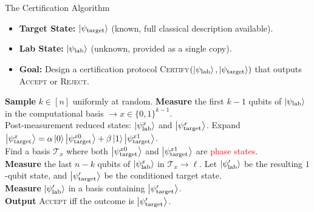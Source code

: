 \begin{frame}{The Certification Algorithm}
    \begin{itemize}
        \item \textbf{Target State:} $\ket{\psi_{\text{target}}}$ (known, full classical description available).
        \item \textbf{Lab State:} $\ket{\psi_{\text{lab}}}$ (unknown, provided as a single copy).
        \item \textbf{Goal:} Design a certification protocol \textsc{Certify}$(\ket{\psi_{\text{lab}}}, \ket{\psi_{\text{target}}})$ that outputs \textsc{Accept} or \textsc{Reject}.
    \end{itemize}
    \begin{algorithm}[H]
        \small
        \caption{\textsc{Certify}$(\ket{\psi_{\text{lab}}}, \ket{\psi_{\text{target}}})$}
        \begin{algorithmic}[1]
        \STATE \textbf{Sample} $k \in [n]$ uniformly at random.
        \STATE \textbf{Measure} the first $k-1$ qubits of $\ket{\psi_{\text{lab}}}$ in the computational basis $\rightarrow x \in \{0,1\}^{k-1}$. \\
        Post-measurement reduced states: $\ket{\psi_{\text{lab}}^x}$ and $\ket{\psi_{\text{target}}^x}$.
        \STATE Expand $\ket{\psi_{\text{target}}^x} = \alpha\ket{0}\ket{\psi_{\text{target}}^{x0}} + \beta\ket{1}\ket{\psi_{\text{target}}^{x1}}$. \\
        Find a basis $\mathcal{T}_x$ where both $\ket{\psi_{\text{target}}^{x0}}$ and $\ket{\psi_{\text{target}}^{x1}}$ are \textcolor{red}{phase states}. \\
        \textbf{Measure} the last $n-k$ qubits of $\ket{\psi_{\text{lab}}^x}$ in $\mathcal{T}_x \rightarrow \ell$.
        \STATE Let $\ket{\psi_{\text{lab}}'}$ be the resulting $1$-qubit state, and $\ket{\psi_{\text{target}}'}$ be the conditioned target state. \\
        \textbf{Measure} $\ket{\psi_{\text{lab}}'}$ in a basis containing $\ket{\psi_{\text{target}}'}$. \\
        \textbf{Output} \textsc{Accept} iff the outcome is $\ket{\psi_{\text{target}}'}$.
        \end{algorithmic}
    \end{algorithm}
\end{frame}

